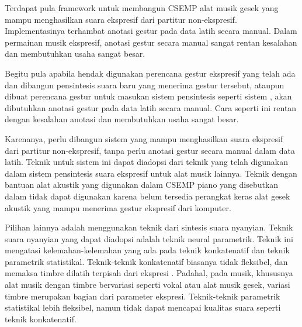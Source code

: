 Terdapat pula framework untuk membangun CSEMP alat musik gesek yang mampu menghasilkan suara ekspresif dari partitur non-ekspresif. \parencite{perez2015} Implementasinya terhambat anotasi gestur pada data latih secara manual. Dalam permainan musik ekspresif, anotasi gestur secara manual sangat rentan kesalahan dan membutuhkan usaha sangat besar.

Begitu pula apabila hendak digunakan perencana gestur ekspresif yang telah ada \parencite{marchini2014quartet}\parencite{yu2017bowing} dan dibangun pensintesis suara baru yang menerima gestur tersebut, ataupun dibuat perencana gestur untuk masukan sistem pensintesis seperti sistem \citet{lindemann2007rpm}, akan dibutuhkan anotasi gestur pada data latih secara manual. Cara seperti ini rentan dengan kesalahan anotasi dan membutuhkan usaha sangat besar.

Karenanya, perlu dibangun sistem yang mampu menghasilkan suara ekspresif dari partitur non-ekspresif, tanpa perlu anotasi gestur secara manual dalam data latih. Teknik untuk sistem ini dapat diadopsi dari teknik yang telah digunakan dalam sistem pensintesis suara ekspresif untuk alat musik lainnya. Teknik dengan bantuan alat akustik yang digunakan dalam CSEMP piano yang disebutkan dalam \citet{schubert2017test} tidak dapat digunakan karena belum tersedia perangkat keras alat gesek akustik yang mampu menerima gestur ekspresif dari komputer.

Pilihan lainnya adalah menggunakan teknik dari sintesis suara nyanyian. Teknik suara nyanyian yang dapat diadopsi adalah teknik neural parametrik. Teknik ini mengatasi kelemahan-kelemahan yang ada pada teknik konkatenatif dan teknik parametrik statistikal\parencite{bonada2017singing}. Teknik-teknik konkatenatif \parencite{Bonada2016ExpressiveSS}\parencite{Bonada2007SynthesisOT} biasanya tidak fleksibel, dan memaksa timbre dilatih terpisah dari ekspresi \parencite{bonada2017singing}. Padahal, pada musik, khususnya alat musik dengan timbre bervariasi seperti vokal atau alat musik gesek, variasi timbre merupakan bagian dari parameter ekspresi. Teknik-teknik parametrik statistikal lebih fleksibel, namun tidak dapat mencapai kualitas suara seperti teknik konkatenatif.

